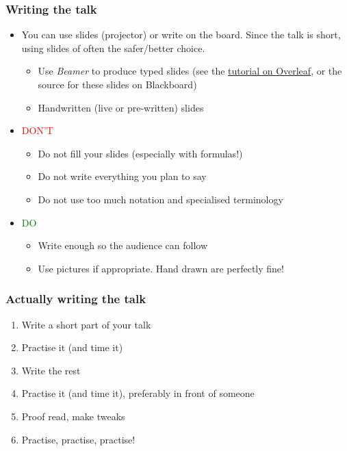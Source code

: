 \documentclass[t]{beamer} %
\begin{document}
\begin{frame}
\frametitle{Writing the talk}

\begin{itemize}
\item You can use slides (projector) or write on the board. Since the talk is short, using slides of often the safer/better choice. 
\begin{itemize}
\item Use \emph{Beamer} to produce typed slides (see the
\href{https://www.overleaf.com/learn/latex/Beamer\_Presentations\%3A\_A\_Tutorial\_for\_Beginners\_(Part\_1)\%E2\%80\%94Getting\_Started}{tutorial on Overleaf},
or the source for these slides on Blackboard)
\item Handwritten (live or pre-written) slides
\end{itemize}
\pause
\item {\textcolor{red}{DON'T}}
\begin{itemize}
\item Do not fill your slides (especially with formulas!) 
\item Do not write everything you plan to say 
\item Do not use too much notation and specialised terminology
\end{itemize}
\pause
\item {\textcolor{green}{DO}}
\begin{itemize}
\item Write enough so the audience can follow
\item Use pictures if appropriate. Hand drawn are perfectly fine! 
\end{itemize}
\end{itemize}
\end{frame}

\begin{frame}
\frametitle{Actually writing the talk}
\begin{enumerate}
\item Write a short part of your talk 
\item Practise it (and time it)
\item Write the rest
\item Practise it (and time it), preferably in front of someone
\item Proof read, make tweaks
\item Practise, practise, practise! 
\end{enumerate}
\end{frame}
\end{document}
